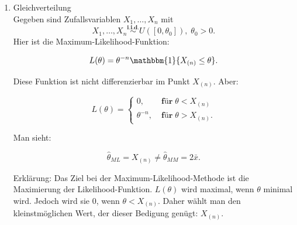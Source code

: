 \documentclass[10pt]{article}
\newcommand{\FZV}{X_1, \ldots, X_n} %
\newenvironment{BSP}[1][]
{\begin{Beispiel}[frametitle=#1]}{\end{Beispiel}}
\begin{document}
\begin{BSP}[Beispiel 1.3.8 (Maximum-Likelihood)]
\begin{enumerate}[label = (\roman*)]
			Damit ist:
			\begin{equation*}
				\left(
				\begin{array}{c}
					\hat{\mu}_{ML}\\
					\hat{\sigma}^2_{ML}
				\end{array}\right)
				=
				\left(
				\begin{array}{c}
					\bar{X}\\
					\bar{X^2}-\bar{X}^2
				\end{array}
				\right).
			\end{equation*}
			Und hier ist wieder:
			\begin{equation*}
				\left(
				\begin{array}{c}
					\hat{\mu}_{ML}\\
					\hat{\sigma}^2_{ML}
				\end{array}\right)
				=
				\left(
				\begin{array}{c}
					\hat{\mu}_{MM}\\
					\hat{\sigma}^2_{MM}
				\end{array}
				\right).
			\end{equation*}
			
			
			\item Gleichverteilung\\
			Gegeben sind Zufallsvariablen $\FZV$ mit
			\begin{equation*}
				\FZV \overset{\textbf{i.i.d.}}{\sim} U([0,\theta_0]), \; \theta_0 >0.
			\end{equation*}
			Hier ist die Maximum-Likelihood-Funktion:
			
			\begin{equation*}
				L(\theta)=\theta^{-n}\mathbbm{1} \{X_{(n)}\leq  \theta \}.
			\end{equation*}
			
			Diese Funktion ist nicht differenzierbar im Punkt $X_{(n)}$. Aber:
			
			\begin{equation*}
				L(\theta) =
				\begin{cases}
					0, \;&\textbf{für}\; \theta < X_{(n)}\\
					\theta^{-n}, \; &\textbf{für} \; \theta > X_{(n)}.
				\end{cases}
			\end{equation*}
			
			Man sieht:
			
			\begin{equation*}
				\hat{\theta}_{ML} = X_{(n)} \neq \hat{\theta}_{MM} = 2\bar{x}.
			\end{equation*}

            Erklärung: Das Ziel bei der Maximum-Likelihood-Methode ist die Maximierung der Likelihood-Funktion. $L(\theta)$ wird maximal, wenn $\theta$ minimal wird. Jedoch wird sie $0$, wenn $\theta < X_{(n)}$. Daher wählt man den kleinstmöglichen Wert, der dieser Bedigung genügt: $X_{(n)}$.
		\end{enumerate}
		
	\end{BSP}
	
\end{document}
